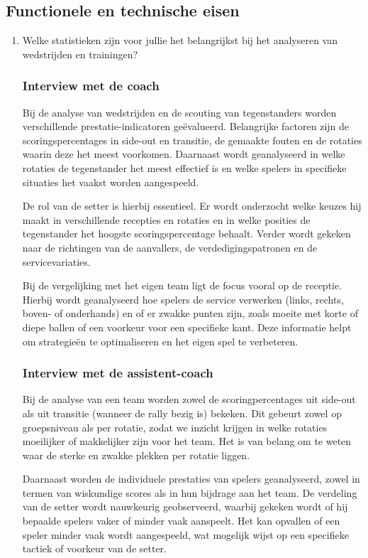 \subsection{Functionele en technische eisen}
\begin{enumerate}
  \item Welke statistieken zijn voor jullie het belangrijkst bij het analyseren van wedstrijden en trainingen?
  \subsubsection{Interview met de coach}
  Bij de analyse van wedstrijden en de scouting van tegenstanders worden verschillende prestatie-indicatoren geëvalueerd. Belangrijke factoren zijn de scoringspercentages in side-out en transitie, de gemaakte fouten en de rotaties waarin deze het meest voorkomen. Daarnaast wordt geanalyseerd in welke rotaties de tegenstander het meest effectief is en welke spelers in specifieke situaties het vaakst worden aangespeeld.

  De rol van de setter is hierbij essentieel. Er wordt onderzocht welke keuzes hij maakt in verschillende recepties en rotaties en in welke posities de tegenstander het hoogste scoringspercentage behaalt. Verder wordt gekeken naar de richtingen van de aanvallers, de verdedigingspatronen en de servicevariaties.
  
  Bij de vergelijking met het eigen team ligt de focus vooral op de receptie. Hierbij wordt geanalyseerd hoe spelers de service verwerken (links, rechts, boven- of onderhands) en of er zwakke punten zijn, zoals moeite met korte of diepe ballen of een voorkeur voor een specifieke kant. Deze informatie helpt om strategieën te optimaliseren en het eigen spel te verbeteren.
  \subsubsection{Interview met de assistent-coach}
  Bij de analyse van een team worden zowel de scoringpercentages uit side-out als uit transitie (wanneer de rally bezig is) bekeken. Dit gebeurt zowel op groepsniveau als per rotatie, zodat we inzicht krijgen in welke rotaties moeilijker of makkelijker zijn voor het team. Het is van belang om te weten waar de sterke en zwakke plekken per rotatie liggen.

  Daarnaast worden de individuele prestaties van spelers geanalyseerd, zowel in termen van wiskundige scores als in hun bijdrage aan het team. De verdeling van de setter wordt nauwkeurig geobserveerd, waarbij gekeken wordt of hij bepaalde spelers vaker of minder vaak aanspeelt. Het kan opvallen of een speler minder vaak wordt aangespeeld, wat mogelijk wijst op een specifieke tactiek of voorkeur van de setter.


\end{enumerate}
